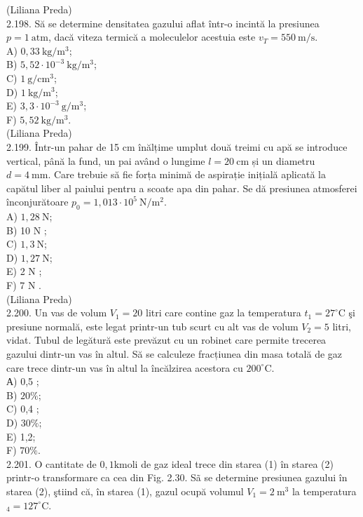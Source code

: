 \documentclass[10pt]{article}
\begin{document}
(Liliana Preda)\\
2.198. Să se determine densitatea gazului aflat într-o incintă la presiunea $p=1 \mathrm{~atm}$, dacă viteza termică a moleculelor acestuia este $v_{T}=550 \mathrm{~m} / \mathrm{s}$.\\
A) $0,33 \mathrm{~kg} / \mathrm{m}^{3}$;\\
B) $5,52 \cdot 10^{-3} \mathrm{~kg} / \mathrm{m}^{3}$;\\
C) $1 \mathrm{~g} / \mathrm{cm}^{3}$;\\
D) $1 \mathrm{~kg} / \mathrm{m}^{3}$;\\
E) $3,3 \cdot 10^{-3} \mathrm{~g} / \mathrm{m}^{3}$;\\
F) $5,52 \mathrm{~kg} / \mathrm{m}^{3}$.\\
(Liliana Preda)\\
2.199. Într-un pahar de 15 cm înălțime umplut două treimi cu apă se introduce vertical, până la fund, un pai având o lungime $l=20 \mathrm{~cm}$ și un diametru $d=4 \mathrm{~mm}$. Care trebuie să fie forța minimă de aspirație inițială aplicată la capătul liber al paiului pentru a scoate apa din pahar. Se dă presiunea atmosferei înconjurătoare $p_{0}=1,013 \cdot 10^{5} \mathrm{~N} / \mathrm{m}^{2}$.\\
A) $1,28 \mathrm{~N}$;\\
B) 10 N ;\\
C) $1,3 \mathrm{~N}$;\\
D) $1,27 \mathrm{~N}$;\\
E) 2 N ;\\
F) 7 N .\\
(Liliana Preda)\\
2.200. Un vas de volum $V_{1}=20$ litri care contine gaz la temperatura $t_{1}=27^{\circ} \mathrm{C}$ şi presiune normală, este legat printr-un tub scurt cu alt vas de volum $V_{2}=5$ litri, vidat. Tubul de legătură este prevăzut cu un robinet care permite trecerea gazului dintr-un vas în altul. Să se calculeze fracțiunea din masa totală de gaz care trece dintr-un vas în altul la încălzirea acestora cu $200^{\circ} \mathrm{C}$.\\
А) 0,5 ;\\
B) $20 \%$;\\
C) 0,4 ;\\
D) $30 \%$;\\
E) 1,2;\\
F) $70 \%$.\\
2.201. O cantitate de $0,1 \mathrm{kmoli}$ de gaz ideal trece din starea (1) în starea (2) printr-o transformare ca cea din Fig. 2.30. Sã se determine presiunea gazului în starea (2), ştiind că, în starea (1), gazul ocupă volumul $V_{1}=2 \mathrm{~m}^{3}$ la temperatura ${ }_{4}=127^{\circ} \mathrm{C}$.
\end{document}

